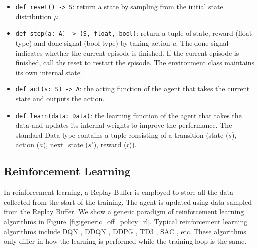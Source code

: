 \begin{itemize}
    \item \texttt{def reset() -> S}: return a state by sampling from the initial state distribution $\mu$.
    \item \texttt{def step(a: A) -> (S, float, bool)}: return a tuple of state, reward (float type) and done signal (bool type) by taking action \textit{a}. The done signal indicates whether the current episode is finished. If the current episode is finished, call the reset to restart the episode. The environment class maintains its own internal state.
    \item \texttt{def act(s: S) -> A}: the acting function of the agent that takes the current state and outputs the action.
    \item \texttt{def learn(data: Data)}: the learning function of the agent that takes the data and updates its internal weights to improve the performance. The standard Data type contains a tuple consisting of a transition (state ($s$), action ($a$), next\_state ($s'$), reward ($r$)).
\end{itemize}

\subsection{Reinforcement Learning}
In reinforcement learning, a Replay Buffer is employed \cite{prioritized_experience_replay} to store all the data collected from the start of the training. The agent is updated using data sampled from the Replay Buffer. We show a generic paradigm of reinforcement learning algorithms in Figure~\ref{fig:generic_off_policy_rl}. 
Typical reinforcement learning algorithms include DQN \cite{dqn}, DDQN \cite{double_q_learning}, DDPG \cite{ddpg}, TD3 \cite{td3}, SAC \cite{sac}, etc. 
These algorithms only differ in how the learning is performed while the training loop is the same.

